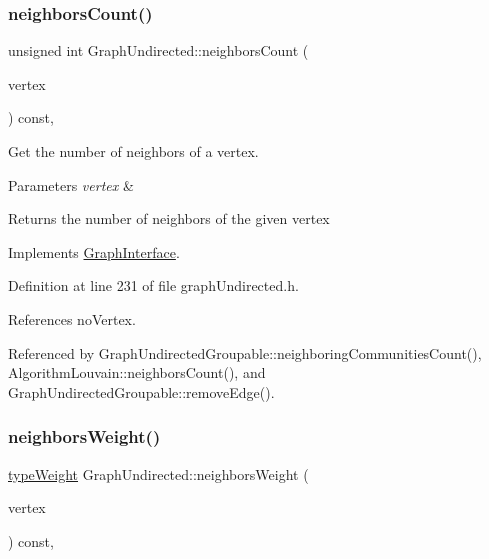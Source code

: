 \subsubsection{\texorpdfstring{neighbors\+Count()}{neighborsCount()}}
{\footnotesize\ttfamily unsigned int Graph\+Undirected\+::neighbors\+Count (\begin{DoxyParamCaption}\item[{const \hyperlink{edge_8h_a5fbd20c46956d479cb10afc9855223f6}{type\+Vertex} \&}]{vertex }\end{DoxyParamCaption}) const\hspace{0.3cm}{\ttfamily [inline]}, {\ttfamily [virtual]}}



Get the number of neighbors of a vertex. 


\begin{DoxyParams}{Parameters}
{\em vertex} & \\
\hline
\end{DoxyParams}
\begin{DoxyReturn}{Returns}
the number of neighbors of the given vertex 
\end{DoxyReturn}


Implements \hyperlink{classGraphInterface_a07f96d04c5481c6f573f478add5f7162}{Graph\+Interface}.



Definition at line 231 of file graph\+Undirected.\+h.



References no\+Vertex.



Referenced by Graph\+Undirected\+Groupable\+::neighboring\+Communities\+Count(), Algorithm\+Louvain\+::neighbors\+Count(), and Graph\+Undirected\+Groupable\+::remove\+Edge().

\mbox{\label{classGraphUndirected_a5bc804358a7bc0087953023c597a621b}} 
\subsubsection{\texorpdfstring{neighbors\+Weight()}{neighborsWeight()}}
{\footnotesize\ttfamily \hyperlink{edge_8h_a2e7ea3be891ac8b52f749ec73fee6dd2}{type\+Weight} Graph\+Undirected\+::neighbors\+Weight (\begin{DoxyParamCaption}\item[{const \hyperlink{edge_8h_a5fbd20c46956d479cb10afc9855223f6}{type\+Vertex} \&}]{vertex }\end{DoxyParamCaption}) const\hspace{0.3cm}{\ttfamily [inline]}, {\ttfamily [virtual]}}



